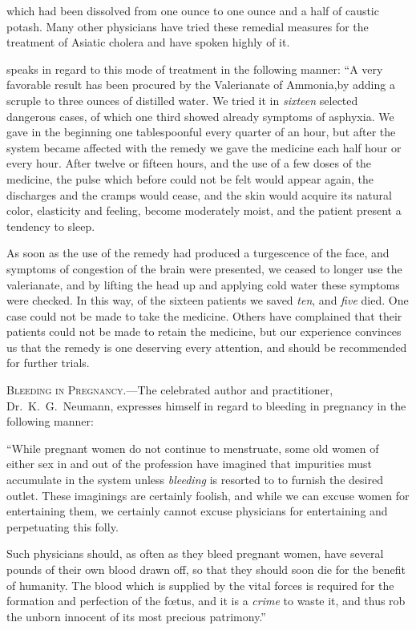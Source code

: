 which had been dissolved from one ounce to one ounce and a half of
caustic potash. Many other physicians have tried these remedial
measures for the treatment of Asiatic cholera and have spoken highly
of it.

 speaks in regard to this mode of treatment
in the following manner: ``A very favorable result has been procured
by the Valerianate of Ammonia,by adding a scruple to three ounces of
distilled water. We tried it in \emph{sixteen} selected dangerous cases, of
which one third showed already symptoms of asphyxia. We gave in
the beginning one tablespoonful every quarter of an hour, but after
the system became affected with the remedy we gave the medicine
each half hour or every hour. After twelve or fifteen hours, and the
use of a few doses of the medicine, the pulse which before could not
be felt would appear again, the discharges and the cramps would cease,
and the skin would acquire its natural color, elasticity and feeling,
become moderately moist, and the patient present a tendency to sleep.

As soon as the use of the remedy had produced a turgescence of the
face, and symptoms of congestion of the brain were presented, we
ceased to longer use the valerianate, and by lifting the head up and
applying cold water these symptoms were checked. In this way, of
the sixteen patients we saved \emph{ten}, and \emph{five} died. One case could not
be made to take the medicine. Others have complained that their
patients could not be made to retain the medicine, but our experience
convinces us that the remedy is one deserving every attention, and
should be recommended for further trials.

\textsc{Bleeding in Pregnancy}.---The celebrated author and practitioner,
Dr.~K.~G.\ Neumann, expresses himself in regard to bleeding in pregnancy
in the following manner:


``While pregnant women do not continue to menstruate, some old
women of either sex in and out of the profession have imagined that
impurities must accumulate in the system unless \emph{bleeding} is resorted to
to furnish the desired outlet. These imaginings are certainly foolish,
and while we can excuse women for entertaining them, we certainly
cannot excuse physicians for entertaining and perpetuating this folly.

Such physicians should, as often as they bleed pregnant women,
have several pounds of their own blood drawn off, so that they should
soon die for the benefit of humanity. The blood which is supplied by
the vital forces is required for the formation and perfection of the fœtus,
and it is a \emph{crime} to waste it, and thus rob the unborn innocent of its
most precious patrimony.''\endinput
